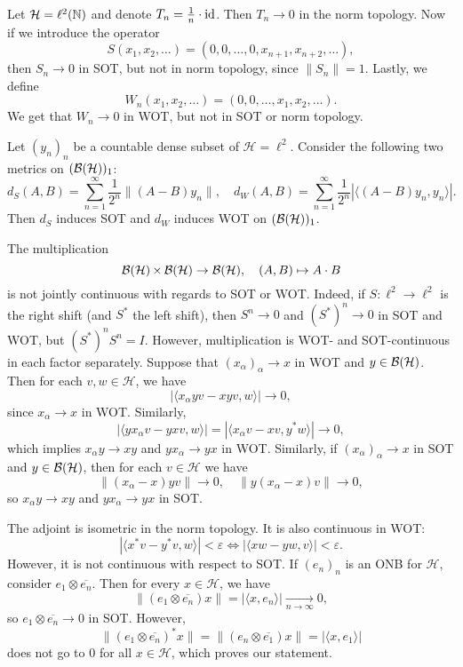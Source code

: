 \begin{example}
  Let $\mathcal{H} = \ell^2 (\mathbb {N})$ and denote $T_n = \frac{1}{n} \cdot \operatorname{id}$.
  Then $T_n \to 0$ in the norm topology. Now if we introduce the operator
  $$S (x_1, x_2, \dots) = (0, 0, \dots, 0, x_{n + 1}, x_{n + 2}, \dots),$$
  then $S_n \to 0$ in SOT, but not in norm topology, since $\|S_n\| = 1$.
  Lastly, we define 
  $$W_n (x_1, x_2, \dots) = (0, 0, \dots, x_1, x_2, \dots).$$
  We get that $W_n \to 0$ in WOT, but not in SOT or norm topology.
\end{example}

\begin{example}
  Let $(y_n)_n$ be a countable dense subset of $\mathcal{H} = \ell^2$.
  Consider the following two metrics on $(\operatorname{\mathcal{B} (\mathcal{H})})_1$:
  $$d_S (A, B) = \sum_{n = 1} ^\infty \frac{1}{2^n} \|(A - B) {y_n}\|,\quad d_W (A, B) = \sum_{n = 1} ^\infty \frac{1}{2^n} \left|\langle(A - B) {y_n} , y_n\rangle\right|.$$
  Then $d_S$ induces SOT and $d_W$ induces WOT on $(\operatorname{\mathcal{B} (\mathcal{H})})_1$.
\end{example}

\begin{example}
  The multiplication 
  $$\operatorname{\mathcal{B} (\mathcal{H})} \times \operatorname{\mathcal{B} (\mathcal{H})} \to \operatorname{\mathcal{B} (\mathcal{H})},\quad (A, B) \mapsto A \cdot B$$
  is not jointly continuous with regards to SOT or WOT. Indeed, if $S: \ell^2 \to \ell^2$ is the right shift (and $S^*$ the left shift),
  then $S^n \to 0$ and $(S^*)^n \to 0$ in SOT and WOT, but $(S^*)^n S^n = I$. However,
  multiplication is WOT- and SOT-continuous in each factor separately.
  Suppose that $(x_\alpha)_\alpha \to x$ in WOT and $y \in \operatorname{\mathcal{B} (\mathcal{H})}$.
  Then for each $v, w \in \mathcal{H}$, we have 
  $$|\langle x_\alpha yv - xyv, w \rangle | \to 0,$$
  since $x_\alpha \to x$ in WOT. Similarly,
  $$|\langle y x_\alpha v - yxv, w \rangle | = |\langle  x_\alpha v - xv, y^*w \rangle | \to 0,$$
  which implies $x_\alpha y \to xy$ and $y x_\alpha \to yx$ in WOT.
  Similarly, if $(x_\alpha)_\alpha \to x$ in SOT and $y \in \operatorname{\mathcal{B} (\mathcal{H})}$,
  then for each $v \in \mathcal{H}$ we have 
  $$\| (x_\alpha - x)yv\| \rightarrow 0,\quad \| y(x_\alpha - x)v\| \rightarrow 0,$$
  so $x_\alpha y \to xy$ and $y x_\alpha \to yx$ in SOT.
\end{example}

\begin{example}
  The adjoint is isometric in the norm topology. It is also continuous in WOT:
  $$|\langle x^* v - y^* v, w \rangle| < \varepsilon \Leftrightarrow |\langle xw - yw, v\rangle| < \varepsilon.$$
  However, it is not continuous with respect to SOT. If $(e_n)_n$ is an ONB for $\mathcal{H}$, consider $e_1 \otimes \overline{e_n}$.
  Then for every $x \in \mathcal{H}$, we have 
  $$\|(e_1 \otimes \overline{e_n}) x \| = |\langle x, e_n \rangle | \xrightarrow[n \to \infty]{} 0,$$
  so $e_1 \otimes \overline{e_n} \to 0$ in SOT. However,
  $$\| (e_1 \otimes \overline{e_n})^* x\| = \| (e_n \otimes \overline{e_1}) x\| = |\langle x, e_1 \rangle |$$
  does not go to $0$ for all $x \in \mathcal{H}$, which proves our statement.
\end{example}

